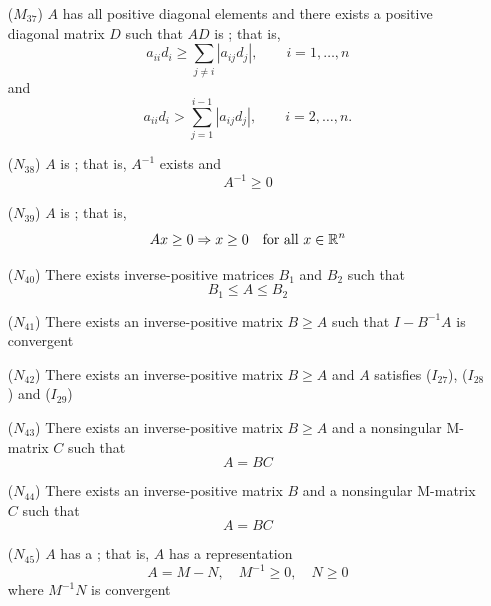 \documentclass[aspectratio=169]{beamer}
\begin{document}
\begin{frame}
\addtocounter{theorem}{-1}
\begin{theorem}[Continued]
\begin{enumerate}
\item[($M_{37}$)] $A$ has all positive diagonal elements and there exists a positive diagonal matrix $D$ such that $AD$ is ; that is,
\[
a_{ii}d_i\geq\sum_{j\neq i}|a_{ij}d_j|,\qquad i=1,\ldots,n
\]
and
\[
a_{ii}d_i>\sum_{j=1}^{i-1}|a_{ij}d_j|,\qquad i=2,\ldots,n.
\]
\end{enumerate}
\end{theorem}
\end{frame}

\begin{frame}
\addtocounter{theorem}{-1}
\begin{theorem}[Continued]
\begin{enumerate}
\item[($N_{38}$)] $A$ is ; that is, $A^{-1}$ exists and
\[
A^{-1}\geq 0
\]
\item[($N_{39}$)] $A$ is ; that is,
\[
Ax\geq 0\Rightarrow x\geq 0\quad\textrm{for all }x\in\mathbb{R}^n
\]
\item[($N_{40}$)] There exists inverse-positive matrices $B_1$ and $B_2$ such that
\[
B_1\leq A\leq B_2
\]
\item[($N_{41}$)] There exists an inverse-positive matrix $B\geq A$ such that $I-B^{-1}A$ is convergent
\item[($N_{42}$)] There exists an inverse-positive matrix $B\geq A$ and $A$ satisfies ($I_{27}$), ($I_{28}$) and ($I_{29}$)
\end{enumerate}
\end{theorem}
\end{frame}

\begin{frame}
\addtocounter{theorem}{-1}
\begin{theorem}[Continued]
\begin{enumerate}
\item[($N_{43}$)] There exists an inverse-positive matrix $B\geq A$ and a nonsingular M-matrix $C$ such that
\[
A=BC
\]
\item[($N_{44}$)] There exists an inverse-positive matrix $B$ and a nonsingular M-matrix $C$ such that
\[
A=BC
\]
\item[($N_{45}$)] $A$ has a ; that is, $A$ has a representation 
\[
A=M-N,\quad M^{-1}\geq 0,\quad N\geq 0
\]
where $M^{-1}N$ is convergent
\end{enumerate}
\end{theorem}
\end{frame}
\end{document}
